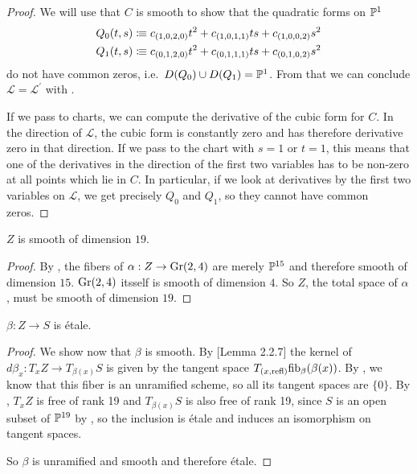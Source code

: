 \begin{proof}
  We will use that \(C\) is smooth to show that the quadratic forms on \(\mathbb{P}^1\) 
  \begin{align*}
    Q_0(t,s)&\vcentcolon\mspace{-1.2mu}\equiv c_{(1,0,2,0)}t^2+c_{(1,0,1,1)}ts+c_{(1,0,0,2)}s^2 \\
    Q_1(t,s)&\vcentcolon\mspace{-1.2mu}\equiv c_{(0,1,2,0)}t^2+c_{(0,1,1,1)}ts+c_{(0,1,0,2)}s^2
  \end{align*}
  do not have common zeros, i.e.\ \(D(Q_0)\cup D(Q_1)=\mathbb{P}^1\).
  From that we can conclude \(\mathcal L=\mathcal L^\prime\) with .

  If we pass to charts, we can compute the derivative of the cubic form for \(C\).
  In the direction of \(\mathcal L\), the cubic form is constantly zero and has therefore derivative zero in that direction.
  If we pass to the chart with \(s=1\) or \(t=1\), this means that one of the derivatives in the direction of the first two variables has to be non-zero at all points which lie in \(C\).
  In particular, if we look at derivatives by the first two variables on \(\mathcal L\),
  we get precisely \(Q_0\) and \(Q_1\), so they cannot have common zeros.
\end{proof}

\begin{lemma}
  \label{smooth-dim-19}
  \(Z\) is smooth of dimension \(19\).
\end{lemma}

\begin{proof}
  By , the fibers of \(\alpha:Z\to \mathrm{Gr}(2,4)\) are merely \(\mathbb{P}^{15}\) and therefore smooth of dimension \(15\). \(\mathrm{Gr}(2,4)\) itsself is smooth of dimension \(4\).
  So \(Z\), the total space of \(\alpha\), must be smooth of dimension \(19\).
\end{proof}

\begin{theorem}
  \(\beta:Z\to S\) is étale.
\end{theorem}

\begin{proof}
  We show now that \(\beta\) is smooth.
  By \cite{diffgeo-article}[Lemma 2.2.7] the kernel of \(d\beta_x:T_xZ\to T_{\beta(x)}S\)
  is given by the tangent space \(T_{(x,\mathrm{refl})}\mathrm{fib}_\beta(\beta(x))\).
  By , we know that this fiber is an unramified scheme, so all its tangent spaces  are \(\{0\}\).
  By , \(T_xZ\) is free of rank 19 and \(T_{\beta(x)}S\) is also free of rank 19,
  since \(S\) is an open subset of \(\mathbb{P}^{19}\) by , so the inclusion is étale and induces an isomorphism on tangent spaces.

  So \(\beta\) is unramified and smooth and therefore étale.
\end{proof}
